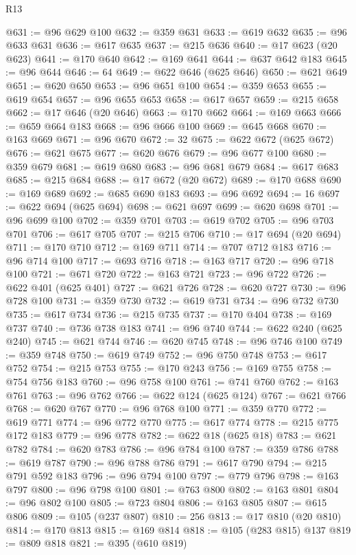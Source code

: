 \begin{lexlean}{R13}
\begin{coremodule}
@631 := @96 @629 @100
@632 := @359 @631
@633 := @619 @632
@635 := @96 @633 @631
@636 := @617 @635
@637 := @215 @636
@640 := @17 @623 (@20 @623)
@641 := @170 @640
@642 := @169 @641
@644 := @637 @642 @183
@645 := @96 @644
@646 := 64
@649 := @622 @646 (@625 @646)
@650 := @621 @649
@651 := @620 @650
@653 := @96 @651 @100
@654 := @359 @653
@655 := @619 @654
@657 := @96 @655 @653
@658 := @617 @657
@659 := @215 @658
@662 := @17 @646 (@20 @646)
@663 := @170 @662
@664 := @169 @663
@666 := @659 @664 @183
@668 := @96 @666 @100
@669 := @645 @668
@670 := @163 @669
@671 := @96 @670
@672 := 32
@675 := @622 @672 (@625 @672)
@676 := @621 @675
@677 := @620 @676
@679 := @96 @677 @100
@680 := @359 @679
@681 := @619 @680
@683 := @96 @681 @679
@684 := @617 @683
@685 := @215 @684
@688 := @17 @672 (@20 @672)
@689 := @170 @688
@690 := @169 @689
@692 := @685 @690 @183
@693 := @96 @692
@694 := 16
@697 := @622 @694 (@625 @694)
@698 := @621 @697
@699 := @620 @698
@701 := @96 @699 @100
@702 := @359 @701
@703 := @619 @702
@705 := @96 @703 @701
@706 := @617 @705
@707 := @215 @706
@710 := @17 @694 (@20 @694)
@711 := @170 @710
@712 := @169 @711
@714 := @707 @712 @183
@716 := @96 @714 @100
@717 := @693 @716
@718 := @163 @717
@720 := @96 @718 @100
@721 := @671 @720
@722 := @163 @721
@723 := @96 @722
@726 := @622 @401 (@625 @401)
@727 := @621 @726
@728 := @620 @727
@730 := @96 @728 @100
@731 := @359 @730
@732 := @619 @731
@734 := @96 @732 @730
@735 := @617 @734
@736 := @215 @735
@737 := @170 @404
@738 := @169 @737
@740 := @736 @738 @183
@741 := @96 @740
@744 := @622 @240 (@625 @240)
@745 := @621 @744
@746 := @620 @745
@748 := @96 @746 @100
@749 := @359 @748
@750 := @619 @749
@752 := @96 @750 @748
@753 := @617 @752
@754 := @215 @753
@755 := @170 @243
@756 := @169 @755
@758 := @754 @756 @183
@760 := @96 @758 @100
@761 := @741 @760
@762 := @163 @761
@763 := @96 @762
@766 := @622 @124 (@625 @124)
@767 := @621 @766
@768 := @620 @767
@770 := @96 @768 @100
@771 := @359 @770
@772 := @619 @771
@774 := @96 @772 @770
@775 := @617 @774
@778 := @215 @775 @172 @183
@779 := @96 @778
@782 := @622 @18 (@625 @18)
@783 := @621 @782
@784 := @620 @783
@786 := @96 @784 @100
@787 := @359 @786
@788 := @619 @787
@790 := @96 @788 @786
@791 := @617 @790
@794 := @215 @791 @592 @183
@796 := @96 @794 @100
@797 := @779 @796
@798 := @163 @797
@800 := @96 @798 @100
@801 := @763 @800
@802 := @163 @801
@804 := @96 @802 @100
@805 := @723 @804
@806 := @163 @805
@807 := @615 @806
@809 := @105 (@237 @807)
@810 := 256
@813 := @17 @810 (@20 @810)
@814 := @170 @813
@815 := @169 @814
@818 := @105 (@283 @815) @137
@819 := @809 @818
@821 := @395 (@610 @819)

\end{coremodule}
\end{lexlean}
